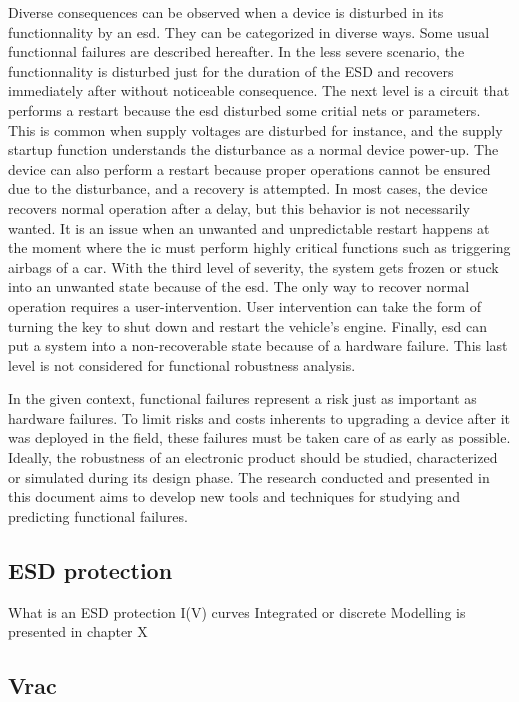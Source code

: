 Diverse consequences can be observed when a device is disturbed in its functionnality by an \gls{esd}.
They can be categorized in diverse ways.
Some usual functionnal failures are described hereafter.
In the less severe scenario, the functionnality is disturbed just for the duration of the ESD and recovers immediately after without noticeable consequence.
The next level is a circuit that performs a restart because the \gls{esd} disturbed some critial nets or parameters.
This is common when supply voltages are disturbed for instance, and the supply startup function understands the disturbance as a normal device power-up.
The device can also perform a restart because proper operations cannot be ensured due to the disturbance, and a recovery is attempted.
In most cases, the device recovers normal operation after a delay, but this behavior is not necessarily wanted.
It is an issue when an unwanted and unpredictable restart happens at the moment where the \gls{ic} must perform highly critical functions such as triggering airbags of a car.
With the third level of severity, the system gets frozen or stuck into an unwanted state because of the \gls{esd}.
The only way to recover normal operation requires a user-intervention.
User intervention can take the form of turning the key to shut down and restart the vehicle's engine.
Finally, \gls{esd} can put a system into a non-recoverable state because of a hardware failure.
This last level is not considered for functional robustness analysis.

In the given context, functional failures represent a risk just as important as hardware failures.
To limit risks and costs inherents to upgrading a device after it was deployed in the field, these failures must be taken care of as early as possible.
Ideally, the robustness of an electronic product should be studied, characterized or simulated during its design phase.
The research conducted and presented in this document aims to develop new tools and techniques for studying and predicting functional failures.

\subsection{ESD protection}

What is an ESD protection
I(V) curves
Integrated or discrete
Modelling is presented in chapter X

\subsection{Vrac}


